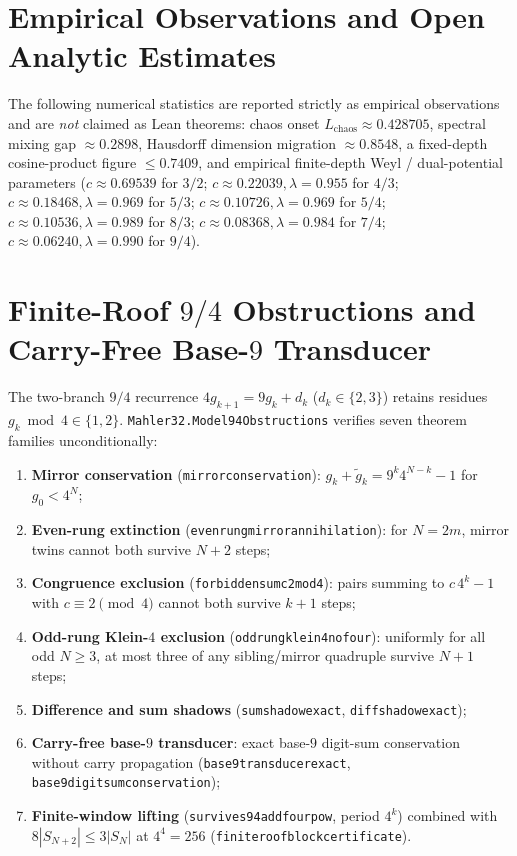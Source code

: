 \documentclass[11pt,a4paper]{article}
\theoremstyle{remark}
\renewcommand{\_}{\textunderscore\allowbreak}
\newcommand{\lean}[1]{\texttt{#1}}
\begin{document}
\section{Empirical Observations and Open Analytic Estimates}
\label{sec:empirical}

The following numerical statistics are reported strictly as empirical observations and are \emph{not} claimed as Lean theorems: chaos onset $L_{\text{chaos}}\approx 0.428705$, spectral mixing gap $\approx 0.2898$, Hausdorff dimension migration $\approx 0.8548$, a fixed-depth cosine-product figure $\le 0.7409$, and empirical finite-depth Weyl / dual-potential parameters ($c\approx 0.69539$ for $3/2$; $c\approx 0.22039,\lambda=0.955$ for $4/3$; $c\approx 0.18468,\lambda=0.969$ for $5/3$; $c\approx 0.10726,\lambda=0.969$ for $5/4$; $c\approx 0.10536,\lambda=0.989$ for $8/3$; $c\approx 0.08368,\lambda=0.984$ for $7/4$; $c\approx 0.06240,\lambda=0.990$ for $9/4$).

\section{Finite-Roof \texorpdfstring{$9/4$}{9/4} Obstructions and Carry-Free Base-\texorpdfstring{$9$}{9} Transducer}
\label{sec:model94}

The two-branch $9/4$ recurrence $4g_{k+1}=9g_k+d_k$ ($d_k\in\{2,3\}$) retains residues $g_k\bmod 4\in\{1,2\}$. \lean{Mahler32.\allowbreak Model94Obstructions} verifies seven theorem families unconditionally:
\begin{enumerate}[leftmargin=1.5em]
  \item \textbf{Mirror conservation} (\lean{mirror\_conservation\_94}): $g_k+\tilde g_k=9^k 4^{N-k}-1$ for $g_0<4^N$;
  \item \textbf{Even-rung extinction} (\lean{even\_rung\_mirror\_annihilation}): for $N=2m$, mirror twins cannot both survive $N+2$ steps;
  \item \textbf{Congruence exclusion} (\lean{forbidden\_sum\_c2\_mod4}): pairs summing to $c\,4^k-1$ with $c\equiv 2\pmod 4$ cannot both survive $k+1$ steps;
  \item \textbf{Odd-rung Klein-$4$ exclusion} (\lean{odd\_rung\_klein4\_no\_four}): uniformly for all odd $N\ge 3$, at most three of any sibling/mirror quadruple survive $N+1$ steps;
  \item \textbf{Difference and sum shadows} (\lean{sum\_shadow\_exact}, \lean{diff\_shadow\_exact});
  \item \textbf{Carry-free base-$9$ transducer}: exact base-$9$ digit-sum conservation without carry propagation (\lean{base9\_transducer\_exact}, \lean{base9\_digit\_sum\_conservation});
  \item \textbf{Finite-window lifting} (\lean{survives94\_add\_four\_pow}, period $4^k$) combined with $8|S_{N+2}|\le 3|S_N|$ at $4^4=256$ (\lean{finite\_roof\_block\_certificate}).
\end{enumerate}
\end{document}
